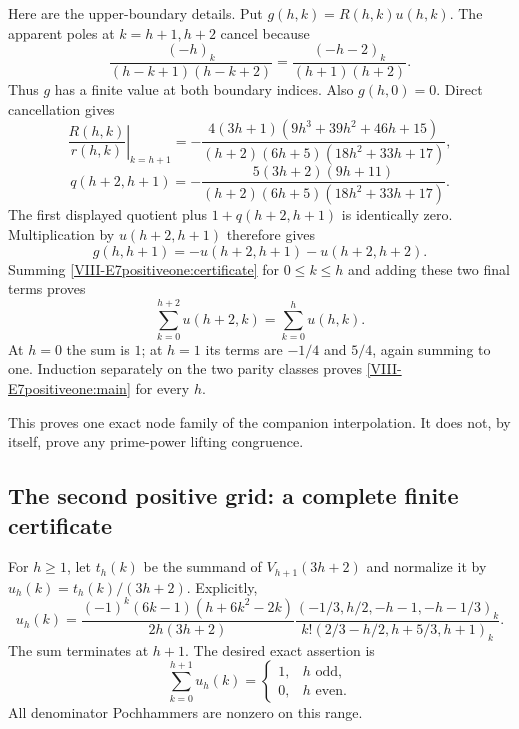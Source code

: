 \documentclass[11pt,letterpaper]{article}
\numberwithin{equation}{section}
\begin{document}
Here are the upper-boundary details. Put $g(h,k)=R(h,k)u(h,k)$.
The apparent poles at $k=h+1,h+2$ cancel because
\[
 \frac{(-h)_k}{(h-k+1)(h-k+2)}
 =\frac{(-h-2)_k}{(h+1)(h+2)}.
\]
Thus $g$ has a finite value at both boundary indices. Also
$g(h,0)=0$. Direct cancellation gives
\[
 \left.\frac{R(h,k)}{r(h,k)}\right|_{k=h+1}
 =-\frac{4(3h+1)(9h^3+39h^2+46h+15)}
 {(h+2)(6h+5)(18h^2+33h+17)},
\]
\[
 q(h+2,h+1)=
 -\frac{5(3h+2)(9h+11)}
 {(h+2)(6h+5)(18h^2+33h+17)}.
\]
The first displayed quotient plus $1+q(h+2,h+1)$ is identically
zero. Multiplication by $u(h+2,h+1)$ therefore gives
\[
 g(h,h+1)=-u(h+2,h+1)-u(h+2,h+2).
\]
Summing \eqref{VIII-E7positiveone:certificate} for $0\le k\le h$
and adding these two final terms proves
\[
 \sum_{k=0}^{h+2}u(h+2,k)=\sum_{k=0}^hu(h,k).
\]
At $h=0$ the sum is $1$; at $h=1$ its terms are $-1/4$ and
$5/4$, again summing to one. Induction separately on the two
parity classes proves \eqref{VIII-E7positiveone:main} for every $h$.

This proves one exact node family of the companion interpolation.
It does not, by itself, prove any prime-power lifting congruence.


\subsection{The second positive grid: a complete finite certificate}
For $h\ge1$, let $t_h(k)$ be the summand of $V_{h+1}(3h+2)$
and normalize it by $u_h(k)=t_h(k)/(3h+2)$. Explicitly,
\[
 u_h(k)=\frac{(-1)^k(6k-1)(h+6k^2-2k)}{2h(3h+2)}
 \frac{(-1/3,h/2,-h-1,-h-1/3)_k}
 {k!(2/3-h/2,h+5/3,h+1)_k}.
\]
The sum terminates at $h+1$. The desired exact assertion is
\[
 \sum_{k=0}^{h+1}u_h(k)=
 \begin{cases}1,&h\text{ odd},\\0,&h\text{ even}.\end{cases}
\]
All denominator Pochhammers are nonzero on this range.
\end{document}
